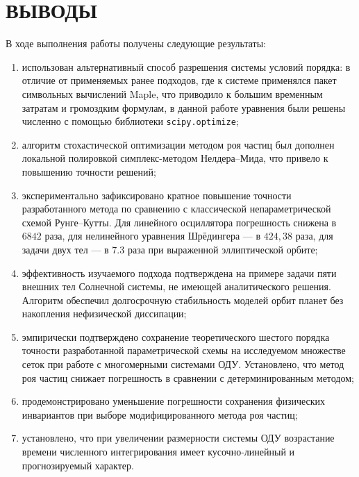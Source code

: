 \newpage
\pagestyle{plain}

\section{ВЫВОДЫ}

В ходе выполнения работы получены следующие результаты:

\begin{enumerate}
	\item использован альтернативный способ разрешения системы условий порядка: в отличие от применяемых ранее подходов, где к системе применялся пакет символьных вычислений Maple, что приводило к большим временным затратам и громоздким формулам, в данной работе уравнения были решены численно с помощью библиотеки \texttt{scipy.optimize};
	\item алгоритм стохастической оптимизации методом роя частиц был дополнен локальной полировкой симплекс-методом Нелдера--Мида, что привело к повышению точности решений;
	\item экспериментально зафиксировано кратное повышение точности разработанного метода по сравнению с классической непараметрической схемой Рунге--Кутты. Для линейного осциллятора погрешность снижена в $6842$ раза, для нелинейного уравнения Шрёдингера — в $424,38$ раза, для задачи двух тел — в $7.3$ раза при выраженной эллиптической орбите;
	\item эффективность изучаемого подхода подтверждена на примере задачи пяти внешних тел Солнечной системы, не имеющей аналитического решения. Алгоритм обеспечил долгосрочную стабильность моделей орбит планет без накопления нефизической диссипации;
	\item эмпирически подтверждено сохранение теоретического шестого порядка точности разработанной параметрической схемы на исследуемом множестве сеток при работе с многомерными системами ОДУ. Установлено, что метод роя частиц снижает погрешность в сравнении с детерминированным методом;
	\item продемонстрировано уменьшение погрешности сохранения физических инвариантов при выборе модифицированного метода роя частиц;
	\item установлено, что при увеличении размерности системы ОДУ возрастание времени численного интегрирования имеет кусочно-линейный и прогнозируемый характер.
\end{enumerate}